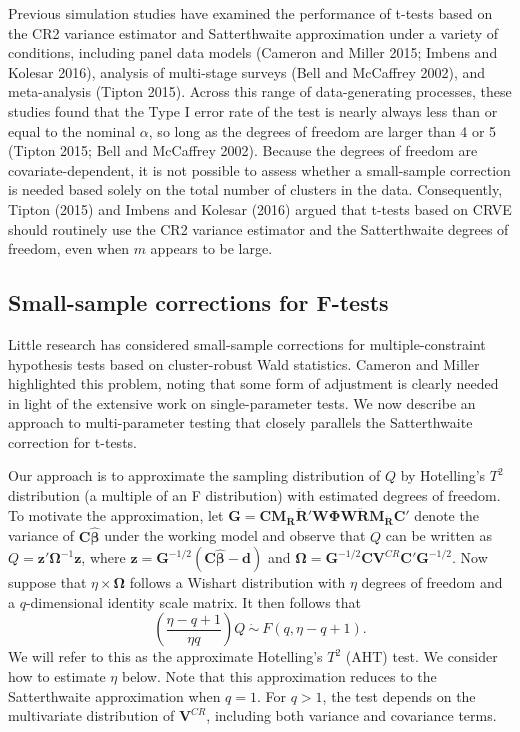 \documentclass[12pt]{article}
\begin{document}
Previous simulation studies have examined the performance of t-tests
based on the CR2 variance estimator and Satterthwaite approximation
under a variety of conditions, including panel data models (Cameron and
Miller 2015; Imbens and Kolesar 2016), analysis of multi-stage surveys
(Bell and McCaffrey 2002), and meta-analysis (Tipton 2015). Across this
range of data-generating processes, these studies found that the Type I
error rate of the test is nearly always less than or equal to the
nominal \(\alpha\), so long as the degrees of freedom are larger than 4
or 5 (Tipton 2015; Bell and McCaffrey 2002). Because the degrees of
freedom are covariate-dependent, it is not possible to assess whether a
small-sample correction is needed based solely on the total number of
clusters in the data. Consequently, Tipton (2015) and Imbens and Kolesar
(2016) argued that t-tests based on CRVE should routinely use the CR2
variance estimator and the Satterthwaite degrees of freedom, even when
\(m\) appears to be large.

\hypertarget{subsec:F-tests}{%
\subsection{Small-sample corrections for F-tests}\label{subsec:F-tests}}

Little research has considered small-sample corrections for
multiple-constraint hypothesis tests based on cluster-robust Wald
statistics. Cameron and Miller highlighted this problem, noting that
some form of adjustment is clearly needed in light of the extensive work
on single-parameter tests. We now describe an approach to
multi-parameter testing that closely parallels the Satterthwaite
correction for t-tests.

Our approach is to approximate the sampling distribution of \(Q\) by
Hotelling's \(T^2\) distribution (a multiple of an F distribution) with
estimated degrees of freedom. To motivate the approximation, let
\(\mathbf{G} = \mathbf{C} \mathbf{M_{\ddot{R}}}\mathbf{\ddot{R}}'\mathbf{W}\boldsymbol\Phi\mathbf{W}\mathbf{\ddot{R}}\mathbf{M_{\ddot{R}}} \mathbf{C}'\)
denote the variance of \(\mathbf{C}\boldsymbol{\hat\beta}\) under the
working model and observe that \(Q\) can be written as
\(Q = \mathbf{z}' \boldsymbol\Omega^{-1} \mathbf{z}\), where
\(\mathbf{z} = \mathbf{G}^{-1/2}\left(\mathbf{C}\boldsymbol{\hat\beta} - \mathbf{d}\right)\)
and
\(\boldsymbol\Omega = \mathbf{G}^{-1/2} \mathbf{C} \mathbf{V}^{CR}\mathbf{C}'\mathbf{G}^{-1/2}\).
Now suppose that \(\eta \times \boldsymbol\Omega\) follows a Wishart
distribution with \(\eta\) degrees of freedom and a \(q\)-dimensional
identity scale matrix. It then follows that \begin{equation}
\label{eq:AHT}
\left(\frac{\eta - q + 1}{\eta q}\right) Q \ \dot\sim \ F(q, \eta - q + 1).
\end{equation} We will refer to this as the approximate Hotelling's
\(T^2\) (AHT) test. We consider how to estimate \(\eta\) below. Note
that this approximation reduces to the Satterthwaite approximation when
\(q = 1\). For \(q > 1\), the test depends on the multivariate
distribution of \(\mathbf{V}^{CR}\), including both variance and
covariance terms.
\end{document}
